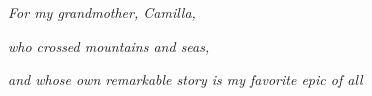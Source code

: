 
\newpage %
\vspace*{\fill}
\begin{Center}     
    \emph{For my grandmother, Camilla,}

    \emph{who crossed mountains and seas,}

    \emph{and whose own remarkable story is my favorite epic of all}

    \end{Center}
\vspace*{\fill}
